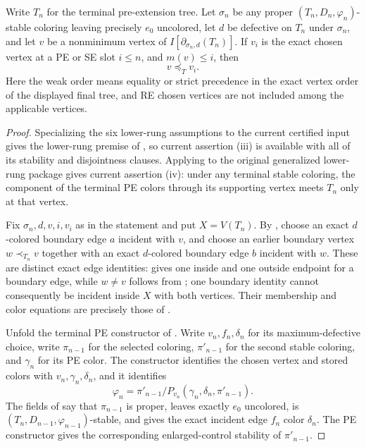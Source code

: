 \begin{helper}
Write \(T_n\) for the terminal pre-extension tree. Let \(\sigma_n\) be
any proper \((T_n,D_n,\varphi_n)\)-stable coloring leaving precisely
\(e_0\) uncolored, let \(d\) be defective on \(T_n\) under \(\sigma_n\),
and let \(v\) be a nonminimum vertex of
\(I[\partial_{\sigma_n,d}(T_n)]\). If \(v_i\) is the exact chosen
vertex at a PE or SE slot \(i\leq n\), and \(m(v)\leq i\), then
\[
                              v\preceq_T v_i .
\]
Here the weak order means equality or strict precedence in the exact
vertex order of the displayed final tree, and RE chosen vertices are not
included among the applicable vertices.
\end{helper}
\begin{proof}
Specializing the six lower-rung assumptions to the current certified
input gives the lower-rung premise of , so current
assertion (iii) is available with all of its stability and disjointness
clauses. Applying  to the original generalized
lower-rung package gives current assertion (iv): under any terminal stable
coloring, the component of the terminal PE colors through its supporting
vertex meets \(T_n\) only at that vertex.

Fix \(\sigma_n,d,v,i,v_i\) as in the statement and put \(X=V(T_n)\).
By , choose an exact \(d\)-colored boundary
edge \(a\) incident with \(v\), and choose an earlier boundary vertex
\(w\prec_{T_n}v\) together with an exact \(d\)-colored boundary edge
\(b\) incident with \(w\). These are distinct exact edge identities:
 gives one inside and one outside endpoint for a
boundary edge, while \(w\ne v\) follows from ;
one boundary identity cannot consequently be incident inside \(X\) with
both vertices. Their membership and color equations are precisely those
of .

Unfold the terminal PE constructor of .
Write \(v_n,f_n,\delta_n\) for its maximum-defective choice, write
\(\pi_{n-1}\) for the selected coloring, \(\pi'_{n-1}\) for the second
stable coloring, and \(\gamma_n\) for its PE color. The constructor
identifies the chosen vertex and stored colors with
\(v_n,\gamma_n,\delta_n\), and it identifies
\[
 \varphi_n=\pi'_{n-1}/P_{v_n}(\gamma_n,\delta_n,\pi'_{n-1}).
\]
The fields of  say that
\(\pi_{n-1}\) is proper, leaves exactly \(e_0\) uncolored, is
\((T_n,D_{n-1},\varphi_{n-1})\)-stable, and gives the exact incident
edge \(f_n\) color \(\delta_n\). The PE constructor gives the
corresponding enlarged-control stability of \(\pi'_{n-1}\).


\end{proof}
